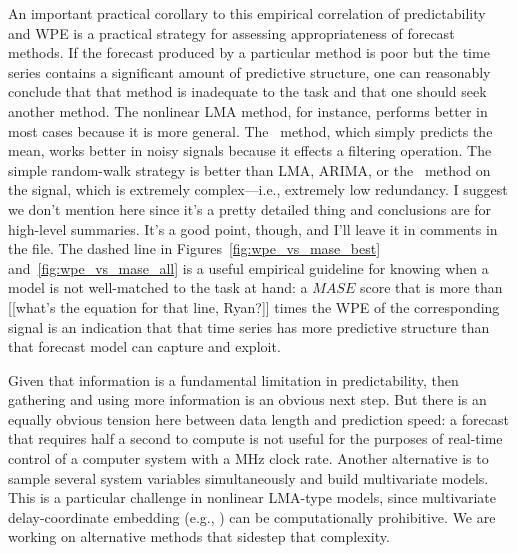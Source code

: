 An important practical corollary to this empirical correlation of
predictability and WPE is a practical strategy for assessing
appropriateness of forecast methods.  If the forecast produced by a
particular method is poor but the time series contains a significant
amount of predictive structure, one can reasonably conclude that that
method is inadequate to the task and that one should seek another
method.  The nonlinear LMA method, for instance, performs better in
most cases because it is more general.  The \naive ~method, which
simply predicts the mean, works better in noisy signals because it
effects a filtering operation.  The simple random-walk strategy is
better than LMA, ARIMA, or the \naive ~method on the \gcc signal,
which is extremely complex---i.e., extremely low redundancy.
{\color{red} I suggest we don't mention \svdone here since it's a
  pretty detailed thing and conclusions are for high-level summaries.
  It's a good point, though, and I'll leave it in comments in the
  file.}
The dashed line in Figures~\ref{fig:wpe_vs_mase_best}
and~\ref{fig:wpe_vs_mase_all} is a useful empirical guideline for
knowing when a model is not well-matched to the task at hand: a $MASE$
score that is more than {\color{red}[[what's the equation for that
      line, Ryan?]]} times the WPE of the corresponding signal is an
indication that that time series has more predictive structure than
that forecast model can capture and exploit.

Given that information is a fundamental limitation in predictability,
then gathering and using more information is an obvious next step.
But there is an equally obvious tension here between data length and
prediction speed: a forecast that requires half a second to compute is
not useful for the purposes of real-time control of a computer system
with a MHz clock rate.  Another alternative is to sample several
system variables simultaneously and build multivariate models.  This
is a particular challenge in nonlinear LMA-type models, since
multivariate delay-coordinate embedding (e.g.,
\cite{cao-multivariate-embedding,deyle-sugihara2011}) can be
computationally prohibitive.  We are working on alternative methods
that sidestep that complexity.


